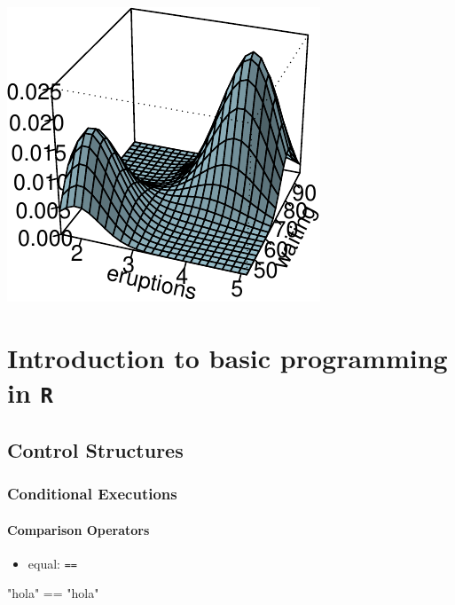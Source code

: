 \documentclass[]{article}
\def\tightlist{}
\newenvironment{Shaded}{\begin{snugshade}}{\end{snugshade}}
\newcommand{\StringTok}[1]{\textcolor[rgb]{0.31,0.60,0.02}{{#1}}}
\newcommand{\NormalTok}[1]{{#1}}
\numberwithin{equation}{section}
\begin{document}
\includegraphics{index_files/figure-latex/unnamed-chunk-114-1.pdf}

\section{\texorpdfstring{Introduction to basic programming in
\texttt{R}}{Introduction to basic programming in R}}\label{introduction-to-basic-programming-in-r}

\subsection{Control Structures}\label{control-structures}

\subsubsection{Conditional Executions}\label{conditional-executions}

\paragraph{Comparison Operators}\label{comparison-operators}

\begin{itemize}
\tightlist
\item
  equal: \texttt{==}
\end{itemize}

\begin{Shaded}
\begin{Highlighting}[]
  \StringTok{"hola"} \NormalTok{==}\StringTok{ "hola"}
\end{Highlighting}
\end{Shaded}
\end{document}
